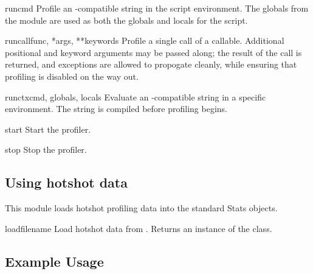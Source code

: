 \begin{methoddesc}{run}{cmd}
Profile an -compatible string in the script environment.
The globals from the  module are used as
both the globals and locals for the script.
\end{methoddesc}

\begin{methoddesc}{runcall}{func, *args, **keywords}
Profile a single call of a callable.
Additional positional and keyword arguments may be passed
along; the result of the call is returned, and exceptions are
allowed to propogate cleanly, while ensuring that profiling is
disabled on the way out.
\end{methoddesc}


\begin{methoddesc}{runctx}{cmd, globals, locals}
Evaluate an -compatible string in a specific environment.
The string is compiled before profiling begins.
\end{methoddesc}

\begin{methoddesc}{start}{}
Start the profiler.
\end{methoddesc}

\begin{methoddesc}{stop}{}
Stop the profiler.
\end{methoddesc}


\subsection{Using hotshot data}



This module loads hotshot profiling data into the standard 
Stats objects.

\begin{funcdesc}{load}{filename}
Load hotshot data from . Returns an instance
of the  class.
\end{funcdesc}

\begin{seealso}
\end{seealso}


\subsection{Example Usage \label{hotshot-example}}

